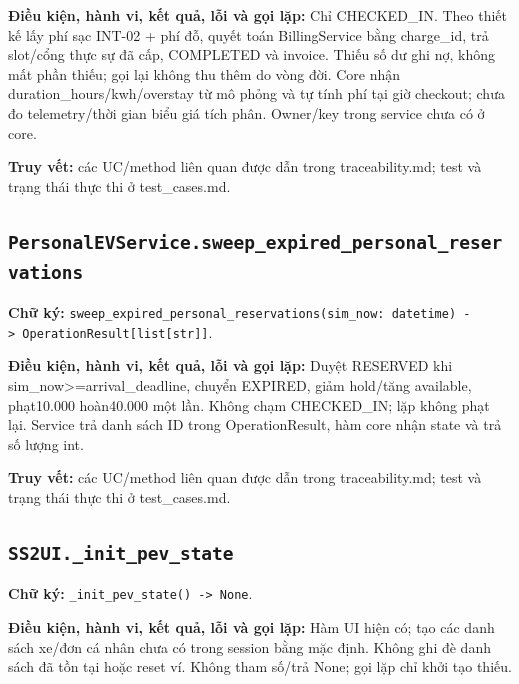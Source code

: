 \documentclass[11pt,a4paper]{article}
\begin{document}
\textbf{Điều kiện, hành vi, kết quả, lỗi và gọi lặp:} Chỉ CHECKED\_IN.
Theo thiết kế lấy phí sạc INT-02 + phí đỗ, quyết toán BillingService
bằng charge\_id, trả slot/cổng thực sự đã cấp, COMPLETED và invoice.
Thiếu số dư ghi nợ, không mất phần thiếu; gọi lại không thu thêm do vòng
đời. Core nhận duration\_hours/kwh/overstay từ mô phỏng và tự tính phí
tại giờ checkout; chưa đo telemetry/thời gian biểu giá tích phân.
Owner/key trong service chưa có ở core.

\textbf{Truy vết:} các UC/method liên quan được dẫn trong
traceability.md; test và trạng thái thực thi ở test\_cases.md.

\hypertarget{personalevservice.sweep_expired_personal_reservations}{%
\subsection{\texorpdfstring{\texttt{PersonalEVService.sweep\_expired\_personal\_reservations}}{PersonalEVService.sweep\_expired\_personal\_reservations}}\label{personalevservice.sweep_expired_personal_reservations}}

\textbf{Chữ ký:}
\texttt{sweep\_expired\_personal\_reservations(sim\_now:\ datetime)\ -\textgreater{}\ OperationResult{[}list{[}str{]}{]}}.

\textbf{Điều kiện, hành vi, kết quả, lỗi và gọi lặp:} Duyệt RESERVED khi
sim\_now\textgreater=arrival\_deadline, chuyển EXPIRED, giảm hold/tăng
available, phạt10.000 hoàn40.000 một lần. Không chạm CHECKED\_IN; lặp
không phạt lại. Service trả danh sách ID trong OperationResult, hàm core
nhận state và trả số lượng int.

\textbf{Truy vết:} các UC/method liên quan được dẫn trong
traceability.md; test và trạng thái thực thi ở test\_cases.md.

\hypertarget{ss2ui._init_pev_state}{%
\subsection{\texorpdfstring{\texttt{SS2UI.\_init\_pev\_state}}{SS2UI.\_init\_pev\_state}}\label{ss2ui._init_pev_state}}

\textbf{Chữ ký:} \texttt{\_init\_pev\_state()\ -\textgreater{}\ None}.

\textbf{Điều kiện, hành vi, kết quả, lỗi và gọi lặp:} Hàm UI hiện có;
tạo các danh sách xe/đơn cá nhân chưa có trong session bằng mặc định.
Không ghi đè danh sách đã tồn tại hoặc reset ví. Không tham số/trả None;
gọi lặp chỉ khởi tạo thiếu.
\end{document}
